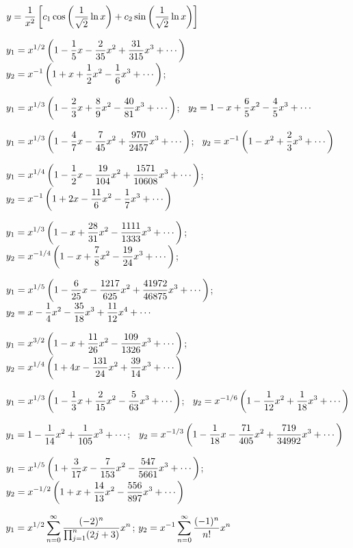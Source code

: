 $y=\displaystyle{\frac{1}{x^2}
\left[c_1\cos\left(\frac{1}{\sqrt{2}} \ln x\right)+c_2\sin
\left(\frac{1}{\sqrt{2}} \ln x\right) \right]}$



$y_1=\displaystyle{x^{1/2}\left(1-\frac{1}{5}x-\frac{2}{35}x^2
+\frac{31}{315}x^3+\cdots\right)}$  \,
$y_2=\displaystyle{x^{-1}\left(1+x+\frac{1}{2}x^2-\frac{1}{6}x^3+\cdots\right)}$; \,

$y_1=\displaystyle{x^{1/3}\left(1-\frac{2}{3}x+\frac{8}{9}x^2-
\frac{40}{81}x^3+\cdots\right)}$; \,
$y_2=\displaystyle{1-x+\frac{6}{5}x^2-\frac{4}{5}x^3+\cdots}$

$y_1=\displaystyle{x^{1/3}\left(1-\frac{4}{7}x-\frac{7}{45}x^2+
\frac{970}{2457}x^3+\cdots\right)}$; \,
$y_2=\displaystyle{x^{-1}\left(1-x^2+\frac{2}{3}x^3+\cdots\right)}$

$y_1=\displaystyle{x^{1/4}\left(1-\frac{1}{2}x-\frac{19}{104}x^2+
\frac{1571}{10608}x^3+\cdots\right)}$; \,
$y_2=\displaystyle{x^{-1}\left(1+2x-\frac{11}{6}x^2-\frac{1}{7}x^3+\cdots\right)}$

$y_1=\displaystyle{x^{1/3}\left(1-x+\frac{28}{31}x^2-\frac{1111}{1333}x^3
+\cdots\right)}$; \,
$y_2=\displaystyle{x^{-1/4}\left(1-x+\frac{7}{8}x^2-\frac{19}{24}x^3+
\cdots\right)}$; \,

$y_1=\displaystyle{x^{1/5}\left(1-\frac{6}{25}x-\frac{1217}{625}x^2+
\frac{41972}{46875}x^3
+\cdots\right)}$; \,
$y_2=\displaystyle{x-\frac{1}{4}x^2-\frac{35}{18}x^3+\frac{11}{12}x^4+\cdots}$

$y_1=\displaystyle{x^{3/2}\left(1-x+\frac{11}{26}x^2-\frac{109}{1326}x^3+
\cdots\right)}$; \,
$y_2=\displaystyle{x^{1/4}\left(1+4x-\frac{131}{24}x^2+\frac{39}{14}x^3+
\cdots\right)}$

$y_1=\displaystyle{x^{1/3}\left(1-\frac{1}{3}x+\frac{2}{15}x^2-
\frac{5}{63}x^3+\cdots\right)}$; \,
$y_2=\displaystyle{x^{-1/6}\left(1-\frac{1}{12}x^2+\frac{1}{18}x^3+\cdots\right)}$

$y_1=\displaystyle{1-\frac{1}{14}x^2+\frac{1}{105}x^3+\cdots}$; \,
$y_2=\displaystyle{x^{-1/3}\left(1-\frac{1}{18}x-\frac{71}{405}x^2+
\frac{719}{34992}x^3+\cdots\right)}$

$y_1=\displaystyle{x^{1/5}\left(1+\frac{3}{17}x-\frac{7}{153}x^2-
\frac{547}{5661}x^3+\cdots\right)}$; \,
$y_2=\displaystyle{x^{-1/2}\left(1+x+\frac{14}{13}x^2-\frac{556}{897}x^3+\cdots\right)}$

$y_1=\displaystyle{x^{1/2}\sum_{n=0}^\infty\frac{(-2)^n}{\prod_{j=1}^n(2j+3)}x^n}$;
$y_2=\displaystyle{x^{-1}\sum_{n=0}^\infty\frac{(-1)^n}{n!}x^n}$


